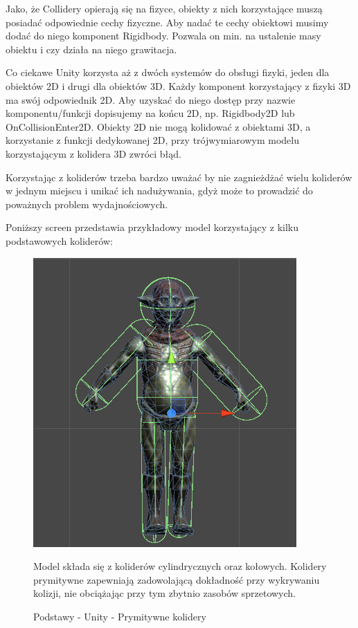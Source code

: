 \documentclass[brudnopis]{xmgr}
\begin{document}
Jako, że Collidery opierają się na fizyce, obiekty z nich korzystające muszą posiadać odpowiednie cechy fizyczne. Aby nadać te cechy obiektowi musimy dodać do niego komponent Rigidbody. Pozwala on min. na ustalenie masy obiektu i czy działa na niego grawitacja. 

Co ciekawe Unity korzysta aż z dwóch systemów do obsługi fizyki, jeden dla obiektów 2D i drugi dla obiektów 3D. Każdy komponent korzystający z fizyki 3D ma swój odpowiednik 2D. Aby uzyskać do niego dostęp przy nazwie komponentu/funkcji dopisujemy na końcu 2D, np. Rigidbody2D lub OnCollisionEnter2D. Obiekty 2D nie mogą kolidować z obiektami 3D, a korzystanie z funkcji dedykowanej 2D, przy trójwymiarowym modelu korzystającym z kolidera 3D zwróci błąd.

Korzystając z koliderów trzeba bardzo uważać by nie zagnieżdżać wielu koliderów w jednym miejscu i unikać ich nadużywania, gdyż może to prowadzić do poważnych problem wydajnościowych.

Poniższy screen przedstawia przykładowy model korzystający z kilku podstawowych koliderów:

\begin{figure}[!htb]
    \begin{center}
    \includegraphics[scale=0.25]{Screeny/rodzial5screeny/model_prymitywne_kolidery}
    \end{center}
    \caption{Podstawy - Unity - Prymitywne kolidery}
Model składa się z koliderów cylindrycznych oraz kołowych. Kolidery prymitywne zapewniają zadowolającą dokładność przy wykrywaniu kolizji, nie obciążając przy tym zbytnio zasobów sprzetowych.
\end{figure}
\end{document}
